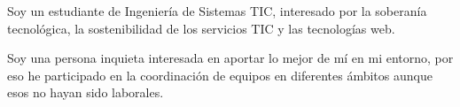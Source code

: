 \documentclass[9pt]{developercv} %
\begin{document}

\begin{minipage}[t]{0.4\textwidth} %
	\vspace{-\baselineskip} %
	Soy un estudiante de Ingeniería de Sistemas TIC, interesado por la soberanía tecnológica, la sostenibilidad de los servicios TIC y las tecnologías web.
	\vspace{\baselineskip}

	Soy una persona inquieta interesada en aportar lo mejor de mí en mi entorno, por eso he participado en la coordinación de equipos en diferentes ámbitos aunque esos no hayan sido laborales.
\end{minipage}
\hfill %
\begin{minipage}[t]{0.5\textwidth} %
	\vspace{-\baselineskip} %
	\begin{barchart}{5.5}
	\end{barchart}
\end{minipage}


\end{document}
